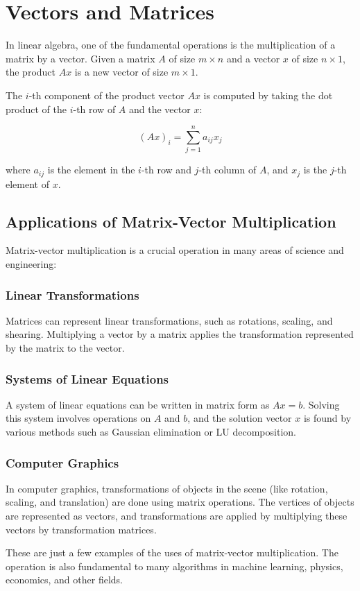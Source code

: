 \chapter{Vectors and Matrices}

In linear algebra, one of the fundamental operations is the multiplication of a matrix by a vector. Given a matrix $A$ of size $m \times n$ and a vector $x$ of size $n \times 1$, the product $Ax$ is a new vector of size $m \times 1$. 

The $i$-th component of the product vector $Ax$ is computed by taking the dot product of the $i$-th row of $A$ and the vector $x$:

\begin{equation}
(Ax)_i = \sum_{j=1}^n a_{ij}x_j
\end{equation}

where $a_{ij}$ is the element in the $i$-th row and $j$-th column of $A$, and $x_j$ is the $j$-th element of $x$.

\section{Applications of Matrix-Vector Multiplication}

Matrix-vector multiplication is a crucial operation in many areas of science and engineering:

\subsection{Linear Transformations}

Matrices can represent linear transformations, such as rotations, scaling, and shearing. Multiplying a vector by a matrix applies the transformation represented by the matrix to the vector.

\subsection{Systems of Linear Equations}

A system of linear equations can be written in matrix form as $Ax = b$. Solving this system involves operations on $A$ and $b$, and the solution vector $x$ is found by various methods such as Gaussian elimination or LU decomposition.

\subsection{Computer Graphics}

In computer graphics, transformations of objects in the scene (like rotation, scaling, and translation) are done using matrix operations. The vertices of objects are represented as vectors, and transformations are applied by multiplying these vectors by transformation matrices.

These are just a few examples of the uses of matrix-vector multiplication. The operation is also fundamental to many algorithms in machine learning, physics, economics, and other fields.
